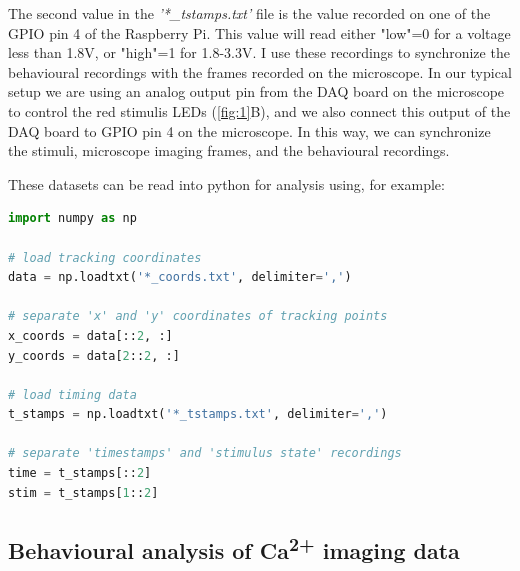 \documentclass[9pt,lineno]{RandlettLab_elife}
\begin{document}
The second value in the \emph{'*\_tstamps.txt'} file is the value recorded on one of the GPIO pin 4 of the Raspberry Pi. This value will read either "low"=0 for a voltage less than 1.8V, or "high"=1 for 1.8-3.3V. I use these recordings to synchronize the behavioural recordings with the frames recorded on the microscope. In our typical setup we are using an analog output pin from the DAQ board on the microscope to control the red stimulis LEDs (\autoref{fig:1}B), and we also connect this output of the DAQ board to GPIO pin 4 on the microscope. In this way, we can synchronize the stimuli, microscope imaging frames, and the behavioural recordings. 

These datasets can be read into python for analysis using, for example: 

\begin{adjustwidth}{2cm}{}
\begin{lstlisting}[language=Python, basicstyle=\small]
import numpy as np

# load tracking coordinates
data = np.loadtxt('*_coords.txt', delimiter=',') 

# separate 'x' and 'y' coordinates of tracking points
x_coords = data[::2, :] 
y_coords = data[2::2, :]

# load timing data
t_stamps = np.loadtxt('*_tstamps.txt', delimiter=',')

# separate 'timestamps' and 'stimulus state' recordings
time = t_stamps[::2]
stim = t_stamps[1::2]

\end{lstlisting}
\end{adjustwidth}

\subsection{Behavioural analysis of Ca\textsuperscript{2+} imaging data}
\end{document}
